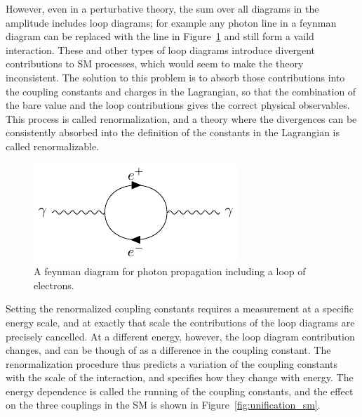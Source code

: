 However, even in a perturbative theory, the sum over all diagrams in the amplitude includes loop diagrams; for example any photon line in a feynman diagram can be replaced with the line in Figure~\ref{fig:loop_diagram} and still form a vaild interaction.
These and other types of loop diagrams introduce divergent contributions to \ac{SM} processes, which would seem to make the theory inconsistent.
The solution to this problem is to absorb those contributions into the coupling constants and charges in the Lagrangian, so that the combination of the bare value and the loop contributions gives the correct physical observables.
This process is called renormalization, and a theory where the divergences can be consistently absorbed into the definition of the constants in the Lagrangian is called renormalizable.

\begin{figure}
\includegraphics[width=\halffig]{figures/loop.pdf}
\caption{A feynman diagram for photon propagation including a loop of electrons.}
\label{fig:loop_diagram}
\end{figure}

Setting the renormalized coupling constants requires a measurement at a specific energy scale, and at exactly that scale the contributions of the loop diagrams are precisely cancelled.
At a different energy, however, the loop diagram contribution changes, and can be though of as a difference in the coupling constant.
The renormalization procedure thus predicts a variation of the coupling constants with the scale of the interaction, and specifies how they change with energy.
The energy dependence is called the running of the coupling constants, and the effect on the three couplings in the \ac{SM} is shown in Figure~\ref{fig:unification_sm}.

